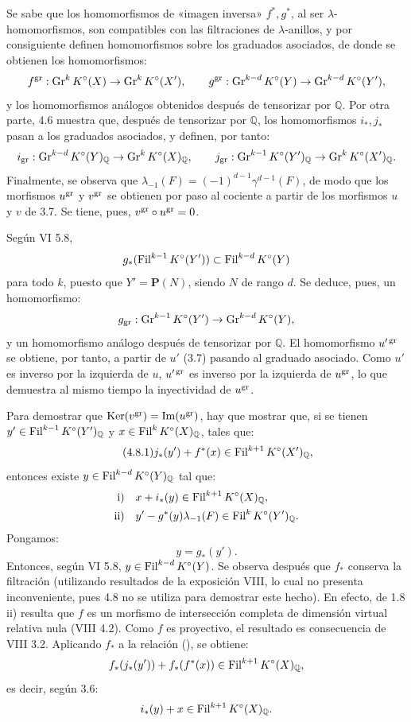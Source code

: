 Se sabe que los homomorfismos de «imagen inversa» \(f^*,g^*\), al ser \(\lambda\)-homomorfismos, son compatibles con las filtraciones de \(\lambda\)-anillos, y por consiguiente definen homomorfismos sobre los graduados asociados, de donde se obtienen los homomorfismos:
\[
  f^{\gr}:\operatorname{Gr}^kK^\circ(X)\to\operatorname{Gr}^kK^\circ(X'),
  \qquad
  g^{\gr}:\operatorname{Gr}^{k-d}K^\circ(Y)\to\operatorname{Gr}^{k-d}K^\circ(Y'),
\]
y los homomorfismos análogos obtenidos después de tensorizar por \(\mathbb Q\). Por otra parte, 4.6 muestra que, después de tensorizar por \(\mathbb Q\), los homomorfismos \(i_*,j_*\) pasan a los graduados asociados, y definen, por tanto:
\[
  i_{\gr}:\operatorname{Gr}^{k-d}K^\circ(Y)_{\mathbb Q}
  \to \operatorname{Gr}^{k}K^\circ(X)_{\mathbb Q},
  \qquad
  j_{\gr}:\operatorname{Gr}^{k-1}K^\circ(Y')_{\mathbb Q}
  \to \operatorname{Gr}^{k}K^\circ(X')_{\mathbb Q}.
\]
Finalmente, se observa que \(\lambda_{-1}(F)=(-1)^{d-1}\gamma^{d-1}(F)\), de modo que los morfismos \(u^{\gr}\) y \(v^{\gr}\) se obtienen por paso al cociente a partir de los morfismos \(u\) y \(v\) de 3.7. Se tiene, pues, \(v^{\gr}\circ u^{\gr}=0\).

Según VI 5.8,
\[
  g_*(\Fil^{k-1}K^\circ(Y'))\subset \Fil^{k-d}K^\circ(Y)
\]
para todo \(k\), puesto que \(Y'=\mathbf P(N)\), siendo \(N\) de rango \(d\). Se deduce, pues, un homomorfismo:
\[
  g_{\gr}:\operatorname{Gr}^{k-1}K^\circ(Y')
  \to\operatorname{Gr}^{k-d}K^\circ(Y),
\]
y un homomorfismo análogo después de tensorizar por \(\mathbb Q\). El homomorfismo \(u'^{\gr}\) se obtiene, por tanto, a partir de \(u'\) (3.7) pasando al graduado asociado. Como \(u'\) es inverso por la izquierda de \(u\), \(u'^{\gr}\) es inverso por la izquierda de \(u^{\gr}\), lo que demuestra al mismo tiempo la inyectividad de \(u^{\gr}\).

Para demostrar que \(\Ker(v^{\gr})=\Im(u^{\gr})\), hay que mostrar que, si se tienen \(y'\in\Fil^{k-1}K^\circ(Y')_{\mathbb Q}\) y \(x\in\Fil^kK^\circ(X)_{\mathbb Q}\), tales que:
\begin{equation}\tag{\sisi{4.6.1}{4.8.1}}
  j_*(y')+f^*(x)\in\Fil^{k+1}K^\circ(X')_{\mathbb Q},
\end{equation}
entonces existe \(y\in\Fil^{k-d}K^\circ(Y)_{\mathbb Q}\) tal que:
\[
\begin{aligned}
\text{i)}\quad &x+i_*(y)\in\Fil^{k+1}K^\circ(X)_{\mathbb Q},\\
\text{ii)}\quad &y'-g^*(y)\lambda_{-1}(F)\in\Fil^{k}K^\circ(Y')_{\mathbb Q}.
\end{aligned}
\]
Pongamos:
\[
  y=g_*(y').
\]
Entonces, según VI 5.8, \(y\in\sisi{\Fil^{k}K^\circ(Y)}{\Fil^{k-d}K^\circ(Y)}\). Se observa después que \(f_*\) conserva la filtración (utilizando resultados de la exposición VIII, lo cual no presenta inconveniente, pues 4.8 no se utiliza para demostrar este hecho). En efecto, de 1.8 ii) resulta que \(f\) es un morfismo de intersección completa de dimensión virtual relativa nula (VIII 4.2). Como \(f\) es proyectivo, el resultado es consecuencia de VIII 3.2. Aplicando \(f_*\) a la relación (), se obtiene:
\[
  f_*(j_*(y'))+f_*(f^*(x))\in\Fil^{k+1}K^\circ(X)_{\mathbb Q},
\]
es decir, según 3.6:
\[
  i_*(y)+x\in\Fil^{k+1}K^\circ(X)_{\mathbb Q}.
\]

